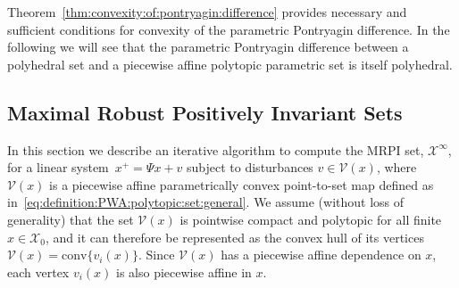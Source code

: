 \documentclass[journal]{IEEEtran}
\providecommand{\conv}{\text{conv}}
\theoremstyle{remark}
\theoremstyle{definition}
\begin{document}
%
Theorem~\ref{thm:convexity:of:pontryagin:difference} provides necessary and sufficient conditions for convexity of the parametric Pontryagin difference. In the following we will see that the parametric Pontryagin difference between a polyhedral set and a piecewise affine polytopic parametric set is itself polyhedral.
%
%
%
%
%
%
\subsection{Maximal Robust Positively Invariant Sets}\label{ssec:MRPI:sets}
%
In this section we describe an iterative algorithm to compute the MRPI set, $\mathcal X^\infty$,
for a linear system~$x^+=\Psi x + v$ subject to disturbances $v\in\mathcal V(x)$, where $\mathcal V(x)$ is 
a piecewise affine parametrically convex point-to-set map defined 
as in~\eqref{eq:definition:PWA:polytopic:set:general}.
%
We assume (without loss of generality) that the set $\mathcal V(x)$ is pointwise compact and polytopic 
for all finite $x\in\mathcal X_0$, and it can therefore be represented as the 
convex hull of its vertices $\mathcal V(x) = \conv\{v_i(x)\}$. 
%
Since ${\mathcal{V}}(x)$ has a piecewise affine dependence on $x$, each vertex $v_i(x)$ is also piecewise 
affine in $x$.
%
\end{document}
